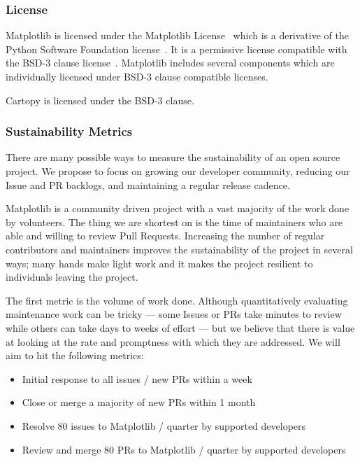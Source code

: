 \documentclass[12pt]{article}
\numberwithin{page}{section}
\begin{document}
\subsubsection{License}

Matplotlib is licensed under the Matplotlib License~\cite{mpl_lic} which is a
derivative of the Python Software Foundation license~\cite{psf_lic}.  It is a
permissive license compatible with the BSD-3 clause
license~\cite{jdh_bsd_opinions}.  Matplotlib includes several components which
are individually licensed under BSD-3 clause compatible licenses.

Cartopy is licensed under the BSD-3 clause.


\subsubsection{Sustainability Metrics}

There are many possible ways to measure the sustainability of an
open source project.  We propose to focus on growing our developer
community, reducing our Issue and PR backlogs, and maintaining a
regular release cadence.

Matplotlib is a community driven project with a vast majority of the
work done by volunteers.  The thing we are shortest on is the time of
maintainers who are able and willing to review Pull Requests.
Increasing the number of regular contributors and maintainers improves
the sustainability of the project in several ways; many hands make
light work and it makes the project resilient to individuals leaving
the project.

The first metric is the volume of work done.  Although quantitatively
evaluating maintenance work can be tricky --- some Issues or PRs take minutes
to review while others can take days to weeks of effort --- but we believe that
there is value at looking at the rate and promptness with which they are
addressed.  We will aim to hit the following metrics:
\begin{itemize}[noitemsep]
\item Initial response to all issues / new PRs within a week  %
\item Close or merge a majority of new PRs within 1 month     %
\item Resolve 80 issues to Matplotlib / quarter by supported developers       %
\item Review and merge 80 PRs to Matplotlib / quarter by supported developers %
\end{itemize}
\end{document}

